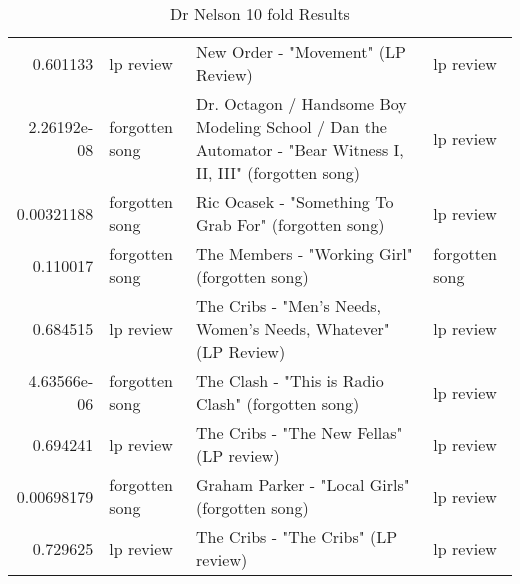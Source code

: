 \documentclass[letterpaper,10pt]{article}
\begin{document}
\begin{table}[H]
\begin{adjustbox}{max width=\linewidth}
\begin{tabular}{rlll}
  0.601133    & lp review                 & New Order - "Movement"  (LP Review)                                                                          & lp review                 \\
  2.26192e-08 & forgotten song            & Dr. Octagon / Handsome Boy Modeling School / Dan the Automator - "Bear Witness I, II, III"  (forgotten song) & lp review                 \\
  0.00321188  & forgotten song            & Ric Ocasek - "Something To Grab For"  (forgotten song)                                                       & lp review                 \\
  0.110017    & forgotten song            & The Members - "Working Girl"  (forgotten song)                                                               & forgotten song            \\
  0.684515    & lp review                 & The Cribs - "Men's Needs, Women's Needs, Whatever"  (LP Review)                                              & lp review                 \\
  4.63566e-06 & forgotten song            & The Clash - "This is Radio Clash"  (forgotten song)                                                          & lp review                 \\
  0.694241    & lp review                 & The Cribs - "The New Fellas"  (LP review)                                                                    & lp review                 \\
  0.00698179  & forgotten song            & Graham Parker - "Local Girls"   (forgotten song)                                                             & lp review                 \\
  0.729625    & lp review                 & The Cribs - "The Cribs"  (LP review)                                                                         & lp review                 \\
\hline
\end{tabular}
\end{adjustbox}
\caption{Dr Nelson 10 fold Results}
  \label{tab:dnresults10f}
\end{table}

\newpage
  

\newpage
\clearpage


\clearpage

\clearpage
   
\end{document}
